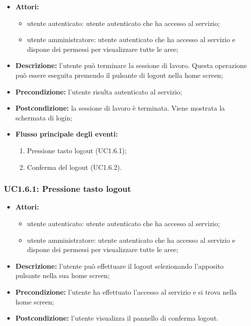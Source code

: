 \begin{itemize}
   	\item \textbf{Attori:}
    \begin{itemize}
    	\item utente autenticato: utente autenticato che ha accesso al servizio;
    	\item utente amministratore: utente autenticato che ha accesso al servizio e dispone dei permessi per visualizzare tutte le aree;
	\end{itemize}
	\item \textbf{Descrizione:} l'utente può terminare la sessione di lavoro. Questa operazione può essere eseguita premendo il pulsante di logout nella home screen;
    \item \textbf{Precondizione:} l'utente risulta autenticato al servizio;
    \item \textbf{Postcondizione:} la sessione di lavoro è terminata. Viene mostrata la schermata di login;
    \item \textbf{Flusso principale degli eventi:}
    \begin{enumerate}
        \item Pressione tasto logout (UC1.6.1);
        \item Conferma del logout (UC1.6.2).
    \end{enumerate}
\end{itemize}

\subsubsection{UC1.6.1: Pressione tasto logout}

\begin{itemize}
   	\item \textbf{Attori:}
    \begin{itemize}
    	\item utente autenticato: utente autenticato che ha accesso al servizio;
    	\item utente amministratore: utente autenticato che ha accesso al servizio e dispone dei permessi per visualizzare tutte le aree;
	\end{itemize}
    \item \textbf{Descrizione:} l'utente può effettuare il logout selezionando l'apposito pulsante nella sua home screen;
    \item \textbf{Precondizione:} l'utente ha effettuato l'accesso al servizio e si trova nella home screen;
    \item \textbf{Postcondizione:} l'utente visualizza il pannello di conferma logout.
\end{itemize}

